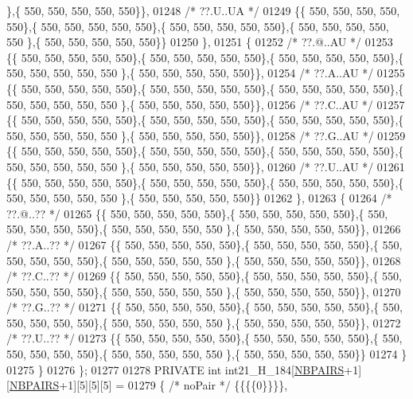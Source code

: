 \begin{DoxyCode}
      \},\{ 550, 550, 550, 550, 550\}\},
01248 \textcolor{comment}{/* ??.U..UA */}
01249 \{\{ 550, 550, 550, 550, 550\},\{ 550, 550, 550, 550, 550\},\{ 550, 550, 550, 550, 550\},\{ 550, 550, 550, 550, 550
      \},\{ 550, 550, 550, 550, 550\}\}
01250 \},
01251 \{
01252 \textcolor{comment}{/* ??.@..AU */}
01253 \{\{ 550, 550, 550, 550, 550\},\{ 550, 550, 550, 550, 550\},\{ 550, 550, 550, 550, 550\},\{ 550, 550, 550, 550, 550
      \},\{ 550, 550, 550, 550, 550\}\},
01254 \textcolor{comment}{/* ??.A..AU */}
01255 \{\{ 550, 550, 550, 550, 550\},\{ 550, 550, 550, 550, 550\},\{ 550, 550, 550, 550, 550\},\{ 550, 550, 550, 550, 550
      \},\{ 550, 550, 550, 550, 550\}\},
01256 \textcolor{comment}{/* ??.C..AU */}
01257 \{\{ 550, 550, 550, 550, 550\},\{ 550, 550, 550, 550, 550\},\{ 550, 550, 550, 550, 550\},\{ 550, 550, 550, 550, 550
      \},\{ 550, 550, 550, 550, 550\}\},
01258 \textcolor{comment}{/* ??.G..AU */}
01259 \{\{ 550, 550, 550, 550, 550\},\{ 550, 550, 550, 550, 550\},\{ 550, 550, 550, 550, 550\},\{ 550, 550, 550, 550, 550
      \},\{ 550, 550, 550, 550, 550\}\},
01260 \textcolor{comment}{/* ??.U..AU */}
01261 \{\{ 550, 550, 550, 550, 550\},\{ 550, 550, 550, 550, 550\},\{ 550, 550, 550, 550, 550\},\{ 550, 550, 550, 550, 550
      \},\{ 550, 550, 550, 550, 550\}\}
01262 \},
01263 \{
01264 \textcolor{comment}{/* ??.@..?? */}
01265 \{\{ 550, 550, 550, 550, 550\},\{ 550, 550, 550, 550, 550\},\{ 550, 550, 550, 550, 550\},\{ 550, 550, 550, 550, 550
      \},\{ 550, 550, 550, 550, 550\}\},
01266 \textcolor{comment}{/* ??.A..?? */}
01267 \{\{ 550, 550, 550, 550, 550\},\{ 550, 550, 550, 550, 550\},\{ 550, 550, 550, 550, 550\},\{ 550, 550, 550, 550, 550
      \},\{ 550, 550, 550, 550, 550\}\},
01268 \textcolor{comment}{/* ??.C..?? */}
01269 \{\{ 550, 550, 550, 550, 550\},\{ 550, 550, 550, 550, 550\},\{ 550, 550, 550, 550, 550\},\{ 550, 550, 550, 550, 550
      \},\{ 550, 550, 550, 550, 550\}\},
01270 \textcolor{comment}{/* ??.G..?? */}
01271 \{\{ 550, 550, 550, 550, 550\},\{ 550, 550, 550, 550, 550\},\{ 550, 550, 550, 550, 550\},\{ 550, 550, 550, 550, 550
      \},\{ 550, 550, 550, 550, 550\}\},
01272 \textcolor{comment}{/* ??.U..?? */}
01273 \{\{ 550, 550, 550, 550, 550\},\{ 550, 550, 550, 550, 550\},\{ 550, 550, 550, 550, 550\},\{ 550, 550, 550, 550, 550
      \},\{ 550, 550, 550, 550, 550\}\}
01274 \}
01275 \}
01276 \};
01277 
01278 PRIVATE \textcolor{keywordtype}{int} int21\_H\_184[\hyperlink{constants_8h_a5e75221c779d618eab81e096f37e32ce}{NBPAIRS}+1][\hyperlink{constants_8h_a5e75221c779d618eab81e096f37e32ce}{NBPAIRS}+1][5][5][5] =
01279 \{ \textcolor{comment}{/* noPair */} \{\{\{\{0\}\}\}\},

\end{DoxyCode}
